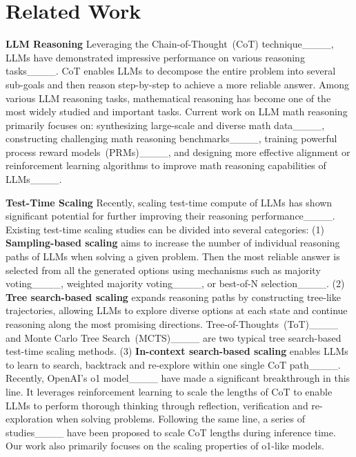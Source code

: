 \section{Related Work}
\textbf{LLM Reasoning}
Leveraging the Chain-of-Thought~(CoT) technique____, LLMs have demonstrated impressive performance on various reasoning tasks____. CoT enables LLMs to decompose the entire problem into several sub-goals and then reason step-by-step to achieve a more reliable answer. Among various LLM reasoning tasks, mathematical reasoning has become one of the most widely studied and important tasks. Current work on LLM math reasoning primarily focuses on: synthesizing large-scale and diverse math data____, constructing challenging math reasoning benchmarks____, training powerful process reward models~(PRMs)____, and designing more effective alignment or reinforcement learning algorithms to improve math reasoning capabilities of LLMs____.~

\textbf{Test-Time Scaling}
Recently, scaling test-time compute of LLMs has shown significant potential for further improving their reasoning performance____. Existing test-time scaling studies can be divided into several categories: (1) \textbf{Sampling-based scaling} aims to increase the number of individual reasoning paths of LLMs when solving a given problem. Then the most reliable answer is selected from all the generated options using mechanisms such as majority voting____, weighted majority voting____, or best-of-N selection____. (2) \textbf{Tree search-based scaling} expands reasoning paths by constructing tree-like trajectories, allowing LLMs to explore diverse options at each state and continue reasoning along the most promising directions. Tree-of-Thoughts~(ToT)____ and Monte Carlo Tree Search~(MCTS)____ are two typical tree search-based test-time scaling methods. (3) \textbf{In-context search-based scaling} enables LLMs to learn to search, backtrack and re-explore within one single CoT path____.  %
Recently, OpenAI's o1 model____ have made a significant breakthrough in this line. It leverages reinforcement learning to scale the lengths of CoT to enable LLMs to perform thorough thinking through reflection, verification and re-exploration when solving problems. Following the same line, a series of studies____ have been proposed to scale CoT lengths during inference time. Our work also primarily focuses on the scaling properties of o1-like models.



